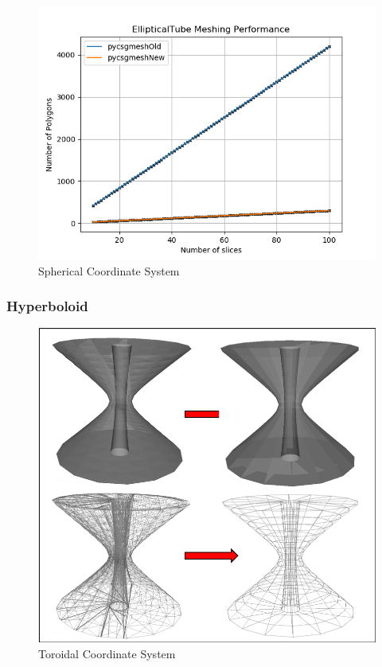 \documentclass[12pt,a4paper]{article}
\begin{document}
\begin{figure}[h!]
\centering
\includegraphics[scale=0.5]{Images//Quad_fits//EllipticalTube_quad.png}
\caption[width=\columnwidth]{Spherical Coordinate System}
\label{conts}
\end{figure}


\newpage
\subsubsection{Hyperboloid}

\begin{figure}[h!]
\centering
\includegraphics[scale=0.5]{Images//Meshes//hyperboloid.png}
\caption[width=\columnwidth]{Toroidal Coordinate System}
\label{conts}
\end{figure}
\end{document}
